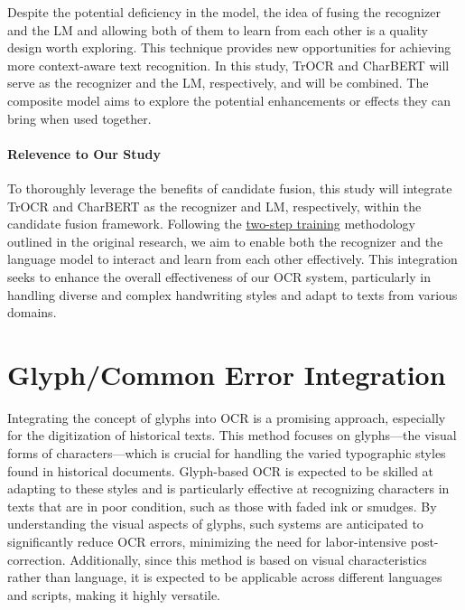 Despite the potential deficiency in the model, the idea of fusing the recognizer and the LM and allowing both of them to learn from each other is a quality design worth exploring. This technique provides new opportunities for achieving more context-aware text recognition. In this study, TrOCR and CharBERT will serve as the recognizer and the LM, respectively, and will be combined. The composite model aims to explore the potential enhancements or effects they can bring when used together.


\paragraph*{Relevence to Our Study}
To thoroughly leverage the benefits of candidate fusion, this study will integrate TrOCR and CharBERT as the recognizer and LM, respectively, within the candidate fusion framework. Following the \hyperlink{2_two_step}{two-step training} methodology outlined in the original research, we aim to enable both the recognizer and the language model to interact and learn from each other effectively. This integration seeks to enhance the overall effectiveness of our OCR system, particularly in handling diverse and complex handwriting styles and adapt to texts from various domains.

\section{Glyph/Common Error Integration}
\label{sec:2_glyph_embedding}
Integrating the concept of glyphs into OCR is a promising approach, especially for the digitization of historical texts. This method focuses on glyphs—the visual forms of characters—which is crucial for handling the varied typographic styles found in historical documents. Glyph-based OCR is expected to be skilled at adapting to these styles and is particularly effective at recognizing characters in texts that are in poor condition, such as those with faded ink or smudges. By understanding the visual aspects of glyphs, such systems are anticipated to significantly reduce OCR errors, minimizing the need for labor-intensive post-correction. Additionally, since this method is based on visual characteristics rather than language, it is expected to be applicable across different languages and scripts, making it highly versatile.

